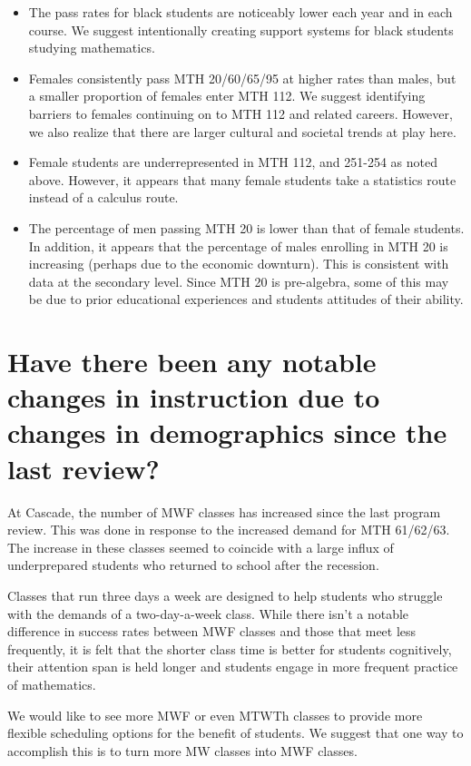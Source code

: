 \begin{itemize}
	\item The pass rates for black students are noticeably lower each year and in each course. We suggest intentionally creating support systems for black students studying mathematics.
	\item Females consistently pass MTH 20/60/65/95 at higher rates than males, but a smaller proportion of females enter MTH 112. We suggest identifying barriers to females continuing on to MTH 112 and related careers. However, we also realize that there are larger cultural and societal trends at play here.
	\item Female students are underrepresented in MTH 112, and 251-254 as noted above. However, it appears that many female students take a statistics route instead of a calculus route.
	\item The percentage of men passing MTH 20 is lower than that of female students. In addition, it appears that the percentage of males enrolling in MTH 20 is increasing (perhaps due to the economic downturn). This is consistent with data at the secondary level. Since MTH 20 is pre-algebra, some of this may be due to prior educational experiences and students attitudes of their ability.
\end{itemize}

\section{Have there been any notable changes in instruction due to changes in demographics since the last review?}
At Cascade, the number of MWF classes has increased since the last program review. This was done in response to the increased demand for MTH 61/62/63. The increase in these classes seemed to coincide with a large influx of underprepared students who returned to school after the recession.

Classes that run three days a week are designed to help students who struggle with the demands of a two-day-a-week class.  While there isn't a notable difference in success rates between MWF classes and those that meet less frequently, it is felt that the shorter class time is better for students cognitively, their attention span is held longer and students engage in more frequent practice of mathematics.  

We would like to see more MWF or even MTWTh classes to provide more flexible scheduling options for the benefit of students. We suggest that one way to accomplish this is to turn more MW classes into MWF classes.

